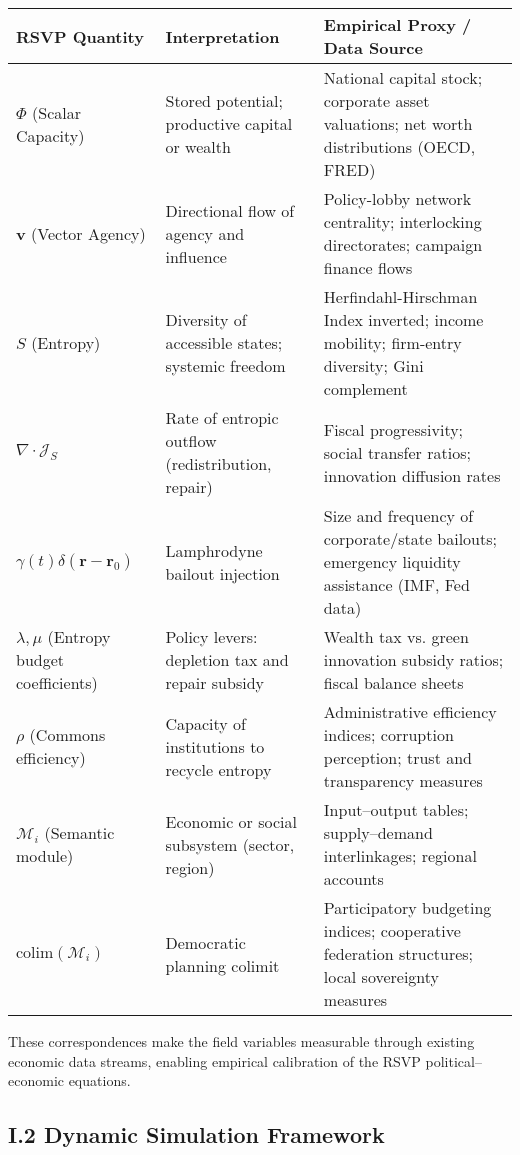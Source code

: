 \documentclass[11pt,a4paper,titlepage]{article}
\theoremstyle{definition}
\begin{document}
\begin{itemize}
\begin{center}
\begin{tabular}{@{}lll@{}}
\toprule
\textbf{RSVP Quantity} & \textbf{Interpretation} & \textbf{Empirical Proxy / Data Source} \\
\midrule
$\Phi$ (Scalar Capacity) & Stored potential; productive capital or wealth & National capital stock; corporate asset valuations; net worth distributions (OECD, FRED) \\
$\mathbf{v}$ (Vector Agency) & Directional flow of agency and influence & Policy-lobby network centrality; interlocking directorates; campaign finance flows \\
$S$ (Entropy) & Diversity of accessible states; systemic freedom & Herfindahl-Hirschman Index inverted; income mobility; firm-entry diversity; Gini complement \\
$\nabla\cdot\mathcal{J}_S$ & Rate of entropic outflow (redistribution, repair) & Fiscal progressivity; social transfer ratios; innovation diffusion rates \\
$\gamma(t)\delta(\mathbf{r}-\mathbf{r}_0)$ & Lamphrodyne bailout injection & Size and frequency of corporate/state bailouts; emergency liquidity assistance (IMF, Fed data) \\
$\lambda,\mu$ (Entropy budget coefficients) & Policy levers: depletion tax and repair subsidy & Wealth tax vs. green innovation subsidy ratios; fiscal balance sheets \\
$\rho$ (Commons efficiency) & Capacity of institutions to recycle entropy & Administrative efficiency indices; corruption perception; trust and transparency measures \\
$\mathcal{M}_i$ (Semantic module) & Economic or social subsystem (sector, region) & Input–output tables; supply–demand interlinkages; regional accounts \\
$\text{colim}(\mathcal{M}_i)$ & Democratic planning colimit & Participatory budgeting indices; cooperative federation structures; local sovereignty measures \\
\bottomrule
\end{tabular}
\end{center}

These correspondences make the field variables measurable through existing economic data streams, enabling empirical calibration of the RSVP political–economic equations.

\subsection*{I.2 Dynamic Simulation Framework}


\end{itemize}
\end{document}
